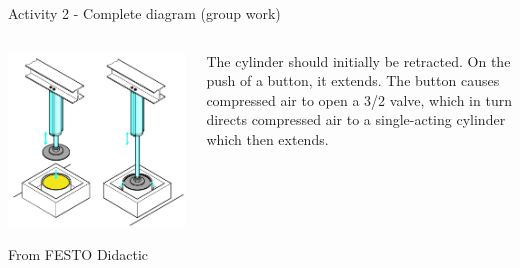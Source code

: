 \documentclass[presentation,aspectratio=1610]{beamer}
\begin{document}
\begin{frame}[label={sec:org31b539a}]{Activity 2 - Complete diagram  (group work)}
\begin{columns}
\begin{column}{0.3\columnwidth}
\begin{center}
\includegraphics[width=0.8\linewidth]{../../figures/cheese-stamping.png}
\end{center}
{\tiny From FESTO Didactic}
\end{column}
\begin{column}{0.7\columnwidth}
The cylinder should initially be retracted. On the push of a button, it extends. The button causes compressed air to open a 3/2 valve, which in turn directs compressed air to a single-acting cylinder which then extends.  
\end{column}
\end{columns}
\end{frame}
\end{document}
